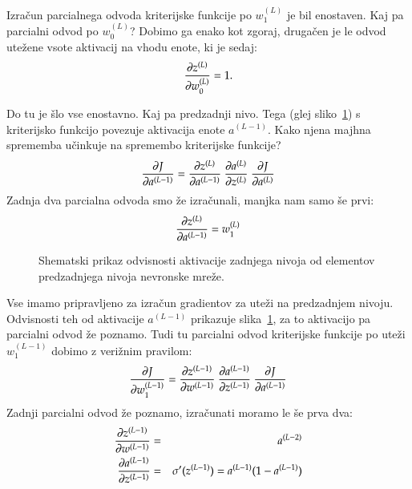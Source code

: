 Izračun parcialnega odvoda kriterijske funkcije po $w_1^{(L)}$ je bil enostaven. Kaj pa parcialni odvod po $w_0^{(L)}$? Dobimo ga enako kot zgoraj, drugačen je le odvod utežene vsote aktivacij na vhodu enote, ki je sedaj:
\begin{eqnarray}
\frac{\partial z^{(L)}}{\partial w_0^{(L)}} = 1.
\end{eqnarray}

Do tu je šlo vse enostavno. Kaj pa predzadnji nivo. Tega (glej sliko~\ref{f-nn-predzadnji}) s kriterijsko funkcijo povezuje aktivacija enote $a^{(L-1)}$. Kako njena majhna sprememba učinkuje na spremembo kriterijske funkcije?
\begin{equation}
  \frac{\partial J}{\partial a^{(L-1)}} = \frac{\partial z^{(L)}}{\partial a^{(L-1)}}\ \frac{\partial a^{(L)}}{\partial z^{(L)}}\ \frac{\partial J}{\partial a^{(L)}}
\end{equation}
\noindent Zadnja dva parcialna odvoda smo že izračunali, manjka nam samo še prvi:
\begin{equation}
  \frac{\partial z^{(L)}}{\partial a^{(L-1)}} = w_1^{(L)}
\end{equation}


\begin{figure}
\caption{Shematski prikaz odvisnosti aktivacije zadnjega nivoja od elementov predzadnjega nivoja nevronske mreže.}
\label{f-nn-predzadnji}
\end{figure}

Vse imamo pripravljeno za izračun gradientov za uteži na predzadnjem nivoju. Odvisnosti teh od aktivacije $a^{(L-1)}$ prikazuje slika~\ref{f-nn-predzadnji}, za to aktivacijo pa parcialni odvod že poznamo. Tudi tu parcialni odvod kriterijske funkcije po uteži $w_1^{(L-1)}$ dobimo z verižnim pravilom:
\begin{equation}
  \pd{J}{w_1^{(L-1)}} = \pd{z^{(L-1)}}{w^{(L-1)}}\ \pd{a^{(L-1)}}{z^{(L-1)}}\ \pd{J}{a^{(L-1)}}
\end{equation}
\noindent Zadnji parcialni odvod že poznamo, izračunati moramo le še prva dva:
\begin{eqnarray}
\frac{\partial z^{(L-1)}}{\partial w^{(L-1)}} & = & a^{(L-2)} \\
\frac{\partial a^{(L-1)}}{\partial z^{(L-1)}} & = & \sigma'(z^{(L-1)}) = a^{(L-1)} (1-a^{(L-1)})
\end{eqnarray}

